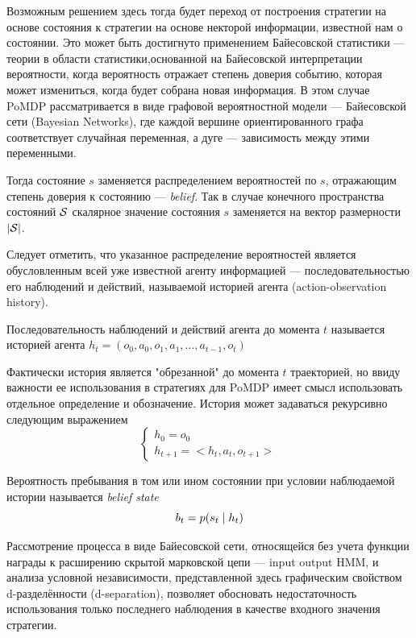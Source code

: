 \documentclass[../main.tex]{subfiles}
\begin{document}
Возможным решением здесь тогда будет переход от построения стратегии на основе состояния к стратегии на основе некторой информации, известной нам о состоянии.
Это может быть достигнуто применением Байесовской статистики --- теории в области статистики,основанной на Байесовской интерпретации вероятности, когда вероятность отражает степень доверия событию, которая может измениться, когда будет собрана новая информация. В этом случае PoMDP рассматривается в виде графовой вероятностной  модели --- Байесовской сети (Bayesian Networks), где каждой вершине ориентированного графа соответствует случайная переменная, а дуге --- зависимость между этими переменными. 

  
Тогда состояние  $s$ заменяется распределением вероятностей по $s$, отражающим степень доверия к состоянию --- \emph{belief}. Так в случае конечного пространства состояний $\mathcal{S}$ скалярное значение состояния $s$ заменяется на вектор размерности  $|\mathcal{S}|$. 

Следует отметить, что указанное распределение вероятностей является обусловленным всей уже известной агенту информацией --- последовательностью его наблюдений и действий,  называемой историей агента (action-observation history). 

\begin{definition}
	Последовательность наблюдений и действий агента до момента $t$ называется историей агента
	$h_t = (o_0, a_0, o_1, a_1, \dots ,a_{t-1}, o_t)$
\end{definition}

Фактически история является "обрезанной" до момента $t$ траекторией, но ввиду важности ее использования в стратегиях для PoMDP имеет смысл использовать отдельное определение и обозначение. История может задаваться рекурсивно следующим выражением
\begin{equation}
\label{update_history}
\begin{cases}
h_0 = o_0 \\
h_{t+1} = <h_{t}, a_{t}, o_{t+1}>
\end{cases}
\end{equation}

\begin{definition}
	Вероятность пребывания в том или ином состоянии при условии наблюдаемой истории  называется \emph{belief state} 
	$$b_t = p(s_t \HM\mid h_{t})$$
	\end{definition}

	Рассмотрение процесса в виде Байесовской сети, относящейся без учета функции награды к расширению скрытой марковской цепи  --- input output HMM, и анализа условной независимости, представленной здесь графическим свойством d-разделённости (d-separation), позволяет обосновать недостаточность использования только последнего наблюдения в качестве входного значения стратегии. 
\end{document}
